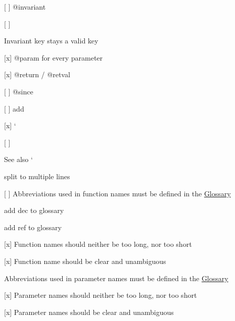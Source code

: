 \begin{DoxyItemize}
\begin{DoxyItemize}
\end{DoxyItemize}
\item \mbox{[} \mbox{]} {\ttfamily @invariant}
\begin{DoxyItemize}
\item \mbox{[} \mbox{]} \begin{DoxyInvariant}{Invariant}
key stays a valid key
\end{DoxyInvariant}

\end{DoxyItemize}
\item \mbox{[}x\mbox{]} {\ttfamily @param} for every parameter
\item \mbox{[}x\mbox{]} {\ttfamily @return} / {\ttfamily @retval}
\item \mbox{[} \mbox{]} {\ttfamily @since}
\begin{DoxyItemize}
\item \mbox{[} \mbox{]} add
\end{DoxyItemize}
\item \mbox{[}x\mbox{]} `{\ttfamily }
\item {\ttfamily \mbox{[} \mbox{]}}\begin{DoxySeeAlso}{See also}
`
\begin{DoxyItemize}
\item split to multiple lines
\end{DoxyItemize}
\end{DoxySeeAlso}

\end{DoxyItemize}


\begin{DoxyItemize}
\item \mbox{[} \mbox{]} Abbreviations used in function names must be defined in the \hyperlink{doc_help_elektra-glossary_md}{Glossary}
\begin{DoxyItemize}
\item add dec to glossary
\item add ref to glossary
\end{DoxyItemize}
\item \mbox{[}x\mbox{]} Function names should neither be too long, nor too short
\item \mbox{[}x\mbox{]} Function name should be clear and unambiguous
\item Abbreviations used in parameter names must be defined in the \hyperlink{doc_help_elektra-glossary_md}{Glossary}
\item \mbox{[}x\mbox{]} Parameter names should neither be too long, nor too short
\item \mbox{[}x\mbox{]} Parameter names should be clear and unambiguous
\end{DoxyItemize}

